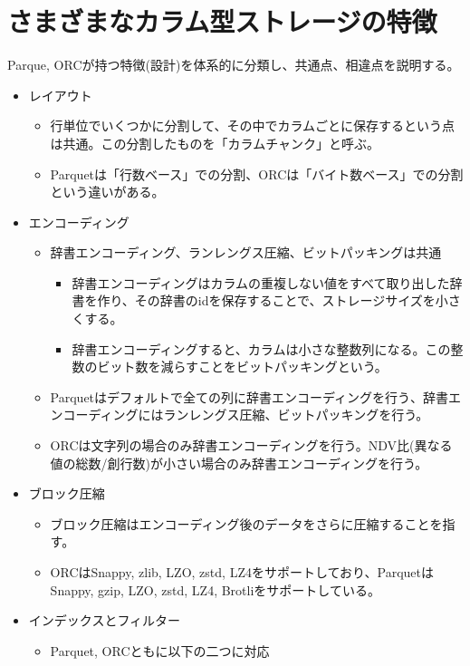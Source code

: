 \documentclass[uplatex]{jsarticle}
\theoremstyle{remark}
\begin{document}
\section{さまざまなカラム型ストレージの特徴}
Parque, ORCが持つ特徴(設計)を体系的に分類し、共通点、相違点を説明する。

\begin{itemize}
  \item レイアウト
  \begin{itemize}
    \item 行単位でいくつかに分割して、その中でカラムごとに保存するという点は共通。この分割したものを「カラムチャンク」と呼ぶ。
    \item Parquetは「行数ベース」での分割、ORCは「バイト数ベース」での分割という違いがある。
  \end{itemize}
  \item エンコーディング
  \begin{itemize}
    \item 辞書エンコーディング、ランレングス圧縮、ビットパッキングは共通
    \begin{itemize}
      \item 辞書エンコーディングはカラムの重複しない値をすべて取り出した辞書を作り、その辞書のidを保存することで、ストレージサイズを小さくする。
      \item 辞書エンコーディングすると、カラムは小さな整数列になる。この整数のビット数を減らすことをビットパッキングという。
    \end{itemize}
    \item Parquetはデフォルトで全ての列に辞書エンコーディングを行う、辞書エンコーディングにはランレングス圧縮、ビットパッキングを行う。
    \item ORCは文字列の場合のみ辞書エンコーディングを行う。NDV比(異なる値の総数/創行数)が小さい場合のみ辞書エンコーディングを行う。
  \end{itemize}
  \item ブロック圧縮
  \begin{itemize}
    \item ブロック圧縮はエンコーディング後のデータをさらに圧縮することを指す。
    \item ORCはSnappy, zlib, LZO, zstd, LZ4をサポートしており、ParquetはSnappy, gzip, LZO, zstd, LZ4, Brotliをサポートしている。
  \end{itemize}
  \item インデックスとフィルター
  \begin{itemize}
    \item Parquet, ORCともに以下の二つに対応

\end{itemize}
\end{itemize}
\end{document}
